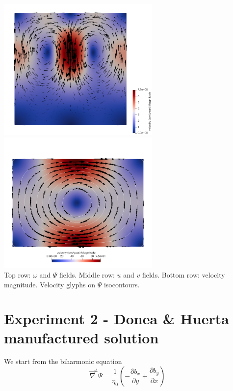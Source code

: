 \begin{center}
\includegraphics[width=8cm]{python_codes/fieldstone_153/results/exp1/vel}
\includegraphics[width=8cm]{python_codes/fieldstone_153/results/exp1/vel2}\\
{\captionfont Top row: $\omega$ and $\Psi$ fields.
Middle row: $u$ and $v$ fields. 
Bottom row: velocity magnitude. Velocity glyphs on $\Psi$ isocontours.}
\end{center}



\section*{Experiment 2 - Donea \& Huerta manufactured solution}



We start from the biharmonic equation 
\[
\vec\nabla^4 \Psi = \frac{1}{\eta_0} \left( -\frac{\partial b_x}{\partial y}
+\frac{\partial b_y}{\partial x} \right)
\]

